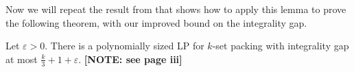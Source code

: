 %
%
Now we will repeat the result from \cite{LapChiLau} that shows how to apply this lemma to prove the following theorem, with our improved bound on the integrality gap.
%
\begin{theorem}\label{thm:LP2}
Let $\varepsilon > 0$. There is a polynomially sized LP for $k$-set packing with integrality gap at most $\frac{k}{3} + 1 + \varepsilon$. \textbf{[NOTE: see page iii]}
\end{theorem}
%
